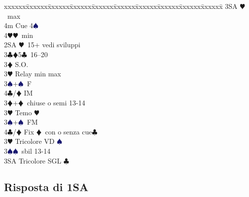 \documentclass[a4paper,italian]{article}
\newcommand{\BC}{\textcolor{OliveGreen}{$\clubsuit$}}
\newcommand{\BD}{\textcolor{RedOrange}{$\vardiamondsuit$}}
\newcommand{\BH}{\textcolor{Red2}{$\varheartsuit${}}}
\newcommand{\BS}{\textcolor{MidnightBlue}{$\spadesuit${}}}
\newenvironment{bidtable}
{\begin{tabbing}

    xxxxxx\=xxxxxx\=xxxxxx\=xxxxxx\=xxxxxx\=xxxxxx\=xxxxxx\=xxxxxx\=xxxxxx\=xxxxxx\=\kill}
{\end{tabbing} }%
\begin{document}
\begin{multicols}{2}
\begin{bidtable}
                                            3SA \BH\ max\\
                                            4m \> Cue 4\BS \\
                                            4\BH {}\BH\ min\-\-\\
                                            2SA \BH\ 15+ vedi sviluppi\\
                                            3\BC {}\BD 5\BC\ 16--20\+\\
                                            3\BD \> S.O.\\
                                            3\BH \> Relay min max\\
                                            3\BS {}+\BS\ F\\
                                            4\BC/\BD \> IM\-\\
                                            3\BD {}+\BD\ chiuse o semi 13-14\+\\
                                            3\BH \> Temo \BH \\
                                            3\BS {}+\BS\ FM\\
                                            4\BC/\BD \> Fix \BD\ con o senza cue\BC \-\\
                                            3\BH \> Tricolore VD \BS \\
                                            3\BS {}\BS\ sbil 13-14\\
                                            3SA \> Tricolore SGL \BC \-
                                        \end{bidtable}
                                        \subsection{Risposta di 1SA}




\end{multicols}
\end{document}
